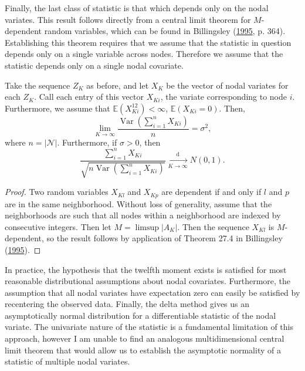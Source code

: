 \documentclass[12pt,twoside]{reedthesis}
\theoremstyle{definition}
\theoremstyle{definition}
\theoremstyle{remark}
\let\BeginKnitrBlock\begin \let\EndKnitrBlock\end
\begin{document}
Finally, the last class of statistic is that which depends only on the
nodal variates. This result follows directly from a central limit
theorem for \(M\)-dependent random variables, which can be found in
Billingsley (\protect\hyperlink{ref-Billingsley1995}{1995}, p. 364).
Establishing this theorem requires that we assume that the statistic in
question depends only on a single variable across nodes. Therefore we
assume that the statistic depends only on a single nodal covariate.

\BeginKnitrBlock{theorem}
\protect\hypertarget{thm:norm3}{}{\label{thm:norm3}}Take the sequence
\(Z_{K}\) as before, and let \(X_K\) be the vector of nodal variates for
each \(Z_{K}\). Call each entry of this vector \(X_{Ki}\), the variate
corresponding to node \(i\). Furthermore, we assume that
\(\mathbb{E}(X_{Ki}^{12}) < \infty\), \(\mathbb{E}(X_{Ki} = 0)\). Then,
\begin{equation*}
\lim_{K \to \infty}\frac{\operatorname{Var}(\sum_{i= 1}^{n} X_{Ki})}{n} = \sigma^2,
\end{equation*}
where \(n = |\mathcal{N}|\). Furthermore, if \(\sigma > 0\), then
\begin{equation*}
\frac{\sum_{i = 1}^{n} X_{Ki}}{\sqrt{n \operatorname{Var}(\sum_{i= 1}^{n} X_{Ki})}} \xrightarrow[K \to \infty]{\mathrm{d}} N(0,1).
\end{equation*}
\EndKnitrBlock{theorem}

\BeginKnitrBlock{proof}
{} Two random variables \(X_{Kl}\) and \(X_{Kp}\)
are dependent if and only if \(l\) and \(p\) are in the same
neighborhood. Without loss of generality, assume that the neighborhoods
are such that all nodes within a neighborhood are indexed by consecutive
integers. Then let \(M = \limsup |A_{K}|\). Then the sequence \(X_{Kl}\)
is \(M\)-dependent, so the result follows by application of Theorem 27.4
in Billingsley (\protect\hyperlink{ref-Billingsley1995}{1995}).\qedhere
\EndKnitrBlock{proof}

In practice, the hypothesis that the twelfth moment exists is satisfied
for most reasonable distributional assumptions about nodal covariates.
Furthermore, the assumption that all nodal variates have expectation
zero can easily be satisfied by recentering the observed data. Finally,
the delta method gives us an asymptotically normal distribution for a
differentiable statistic of the nodal variate. The univariate nature of
the statistic is a fundamental limitation of this approach, however I am
unable to find an analogous multidimensional central limit theorem that
would allow us to establish the asymptotic normality of a statistic of
multiple nodal variates.
\end{document}

